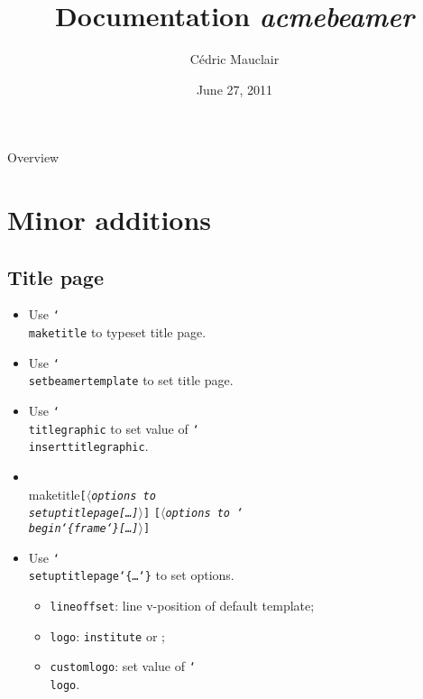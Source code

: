 \documentclass[utf8, a4paper]{beamer}
\newcommand*\cs[1]{\texttt{\char`\\#1}}
\newcommand*\meta[1]{\ensuremath{\langle}{\em#1}\ensuremath{\rangle}}
\newcommand*\marg[1]{\texttt{\char`\{#1\char`\}}}
\newcommand*\oarg[1]{\texttt{[#1]}}
\newcommand*\benv[1]{\texttt{\char`\\begin\char`\{#1\char`\}}}
\newcommand*\pkg[1]{{\rmfamily\itshape #1}}
\let\type\texttt
\newcommand*\default[1]{\underbar{#1}}
\begin{document}
\title{Documentation \pkg{acmebeamer}}
\author{Cédric Mauclair}
\date{June 27, 2011}

\maketitle

\begin{frame}{Overview}
  \tableofcontents
\end{frame}

\section{Minor additions}

\subsection{Title page}

\begin{frame}[fragile]

  \begin{itemize}
  \item Use \cs{maketitle} to typeset title page.
  \item Use \cs{setbeamertemplate} to set title page.
  \item Use \cs{titlegraphic} to set value of \cs{inserttitlegraphic}.
  \end{itemize}

  \vfill
  \begin{itemize}
  \item
\begin{semiverbatim}
\\maketitle\oarg{\meta{options to \\setuptitlepage\oarg{…}}}
          \oarg{\meta{options to \benv{frame}\oarg{…}}}
\end{semiverbatim}
  \item Use \cs{setuptitlepage}\marg{…} to set options.
    \begin{itemize}
    \item \type{lineoffset}: line v-position of default template;
    \item \type{logo}: \type{institute} or \type{\default{none}};
    \item \type{customlogo}: set value of \cs{logo}.
    \end{itemize}
  \end{itemize}

\end{frame}
\end{document}
